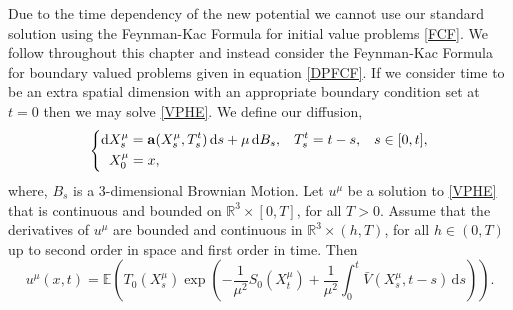 \documentclass[a4paper,12pt,draft]{report}
\theoremstyle{remark}
\theoremstyle{definition}
\begin{document}
Due to the time dependency of the new potential we cannot use our standard solution using the Feynman-Kac Formula for initial value problems \eqref{FCF}.  We follow \cite{ANSRAT} throughout this chapter and instead consider the Feynman-Kac Formula for boundary valued problems given in equation \eqref{DPFCF}.  If we consider time to be an extra spatial dimension with an appropriate boundary condition set at $t = 0$ then we may solve \eqref{VPHE}.  We define our diffusion,
$$
\left\{
\begin{aligned}
& \mathrm{d}X_s^\mu = \bold{a}(X_s^\mu, T_s^t)\,\mathrm{d}s + \mu\,\mathrm{d}B_s, \hspace{0.3cm} T_s^t = t - s, \hspace{0.3cm} s \in [0, t],\\
& \hspace{0.2cm} X_0^\mu = x,
\end{aligned}
\right.
$$
where, $B_s$ is a 3-dimensional Brownian Motion.
\theorem
{
Let $u^\mu$ be a solution to \eqref{VPHE} that is continuous and bounded on $\mathbb{R}^3 \times [0, T]$, for all $T > 0$.  Assume that the derivatives of $u^\mu$ are bounded and continuous in $\mathbb{R}^3 \times (h, T)$, for all $h \in (0, T)$ up to second order in space and first order in time. Then
\begin{equation}
u^\mu(x, t) = \mathbb{E}\left(T_0(X_s^\mu)\exp\left(-\frac{1}{\mu^2}S_0(X_t^\mu) + \frac{1}{\mu^2}\int_0^t\bar{V}(X_s^\mu, t - s)\,\mathrm{d}s\right)\right). \label{FCF2}
\end{equation}
}
\proof
\end{document}
